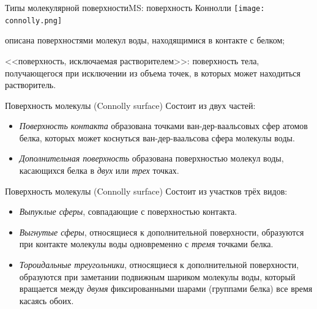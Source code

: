 \documentclass{beamer}
\begin{document}
    \begin{frame}{Типы молекулярной поверхности}{MS: поверхность Коннолли}
        \texttt{[image: connolly.png]}

        описана поверхностями молекул воды, находящимися в контакте с белком;

        <<поверхность, исключаемая растворителем>>:
        поверхность тела, получающегося при исключении из объема точек,
        в которых может находиться растворитель.
    \end{frame}

    \begin{frame}{Поверхность молекулы (Connolly surface)}
        Состоит из двух частей:
        \begin{itemize}
        \item \emph{Поверхность контакта} образована точками ван-дер-ваальсовых
            сфер атомов белка, которых может коснуться ван-дер-ваальсова сфера
            молекулы воды.
        \item \emph{Дополнительная поверхность} образована поверхностью
            молекул воды, касающихся белка в \emph{двух} или \emph{трех} точках.
        \end{itemize}
    \end{frame}

    \begin{frame}{Поверхность молекулы (Connolly surface)}
        Состоит из участков трёх видов:
        \begin{itemize}
        \item \emph{Выпуклые сферы}, совпадающие с поверхностью контакта.
        \item \emph{Выгнутые сферы}, относящиеся к дополнительной поверхности,
            образуются при контакте молекулы воды одновременно с \emph{тремя}
            точками белка.
        \item \emph{Тороидальные треугольники},
            относящиеся к дополнительной поверхности,
            образуются при заметании подвижным шариком молекулы воды,
            который вращается между \emph{двумя} фиксированными шарами
            (группами белка) все время касаясь обоих.
        \end{itemize}
    \end{frame}
\end{document}
